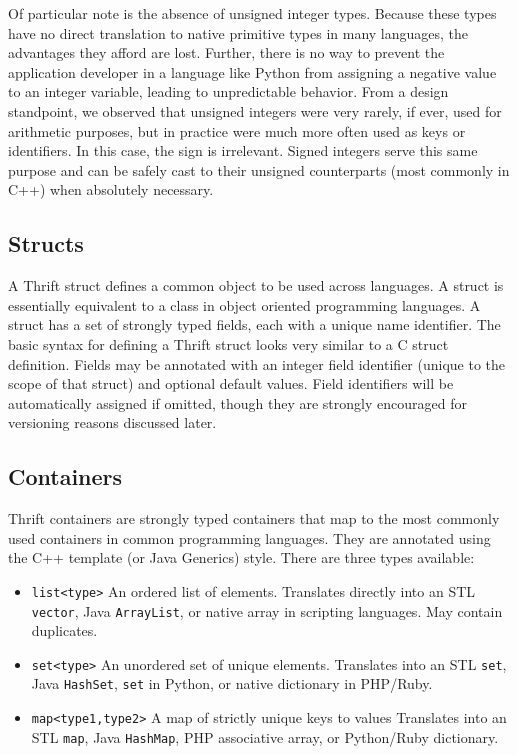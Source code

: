 \documentclass[nocopyrightspace,blockstyle]{sigplanconf}
\begin{document}
Of particular note is the absence of unsigned integer types. Because these
types have no direct translation to native primitive types in many languages,
the advantages they afford are lost. Further, there is no way to prevent the
application developer in a language like Python from assigning a negative value
to an integer variable, leading to unpredictable behavior. From a design
standpoint, we observed that unsigned integers were very rarely, if ever, used
for arithmetic purposes, but in practice were much more often used as keys or
identifiers. In this case, the sign is irrelevant. Signed integers serve this
same purpose and can be safely cast to their unsigned counterparts (most
commonly in C++) when absolutely necessary.

\subsection{Structs}

A Thrift struct defines a common object to be used across languages. A struct
is essentially equivalent to a class in object oriented programming
languages. A struct has a set of strongly typed fields, each with a unique
name identifier. The basic syntax for defining a Thrift struct looks very
similar to a C struct definition. Fields may be annotated with an integer field
identifier (unique to the scope of that struct) and optional default values.
Field identifiers will be automatically assigned if omitted, though they are
strongly encouraged for versioning reasons discussed later.

\subsection{Containers}

Thrift containers are strongly typed containers that map to the most commonly
used containers in common programming languages. They are annotated using
the C++ template (or Java Generics) style. There are three types available:
\begin{itemize}
\item \texttt{list<type>} An ordered list of elements. Translates directly into
an STL \texttt{vector}, Java \texttt{ArrayList}, or native array in scripting languages. May
contain duplicates.
\item \texttt{set<type>} An unordered set of unique elements. Translates into
an STL \texttt{set}, Java \texttt{HashSet}, \texttt{set} in Python, or native
dictionary in PHP/Ruby.
\item \texttt{map<type1,type2>} A map of strictly unique keys to values
Translates into an STL \texttt{map}, Java \texttt{HashMap}, PHP associative
array, or Python/Ruby dictionary.
\end{itemize}
\end{document}
